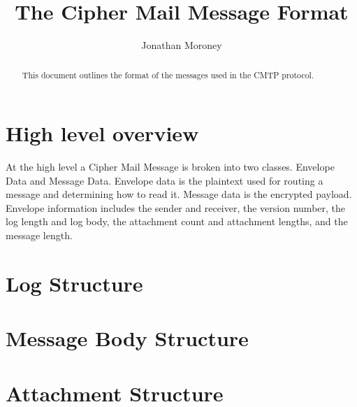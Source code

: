 \documentclass[a4paper,11pt]{article}
\title{The Cipher Mail Message Format}
\author{Jonathan Moroney}
\begin{document}
\maketitle
\tableofcontents

\begin{abstract}
This document outlines the format of the messages used in the CMTP protocol.
\end{abstract}

\section{High level overview}
At the high level a Cipher Mail Message is broken into two classes. Envelope Data and Message Data. Envelope data is the plaintext used for routing a message and determining how to read it. Message data is the encrypted payload. Envelope information includes the sender and receiver, the version number, the log length and log body, the attachment count and attachment lengths, and the message length.

\section{Log Structure}

\section{Message Body Structure}

\section{Attachment Structure}
\end{document}
